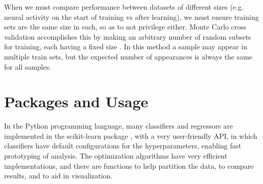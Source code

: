     When we must compare performance between datasets of different sizes (e.g. neural activity on the start of training vs after learning), we must ensure training sets are the same size in each, so as to not privilege either. Monte Carlo cross validation accomplishes this by making an arbitrary number of random subsets for training, each having a fixed size \cite{xu2001monte}. In this method a sample may appear in multiple train sets, but the expected number of appearances is always the same for all samples.

\section*{Packages and Usage}
    In the Python programming language, many classifiers and regressors are implemented in the scikit-learn package \cite{scikit-learn}, with a very user-friendly API, in which classifiers have default configurations for the hyperparameters, enabling fast prototyping of analysis.
    The optimization algorithms have very efficient implementations, and there are functions to help partition the data, to compare results, and to aid in visualization. 
